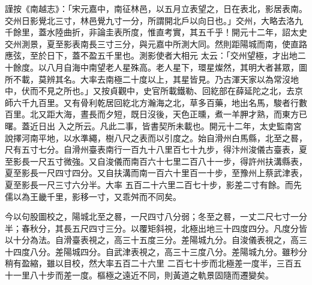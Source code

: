 \begin{pinyinscope}
 謹按《南越志》：「宋元嘉中，南征林邑，以五月立表望之，日在表北，影居表南。交州日影覺北三寸，林邑覺九寸一分，所謂開北戶以向日也。」交州，大略去洛九千餘里，蓋水陸曲折，非論圭表所度，惟直考實，其五千乎！開元十二年，詔太史交州測景，夏至影表南長三寸三分，與元嘉中所測大同。然則距陽城而南，使直路應弦，至於日下，蓋不盈五千里也。測影使者大相元
 太云：「交州望極，才出地二十餘度。以八月自海中南望老人星殊高。老人星下，環星燦然，其明大者甚眾，圖所不載，莫辨其名。大率去南極二十度以上，其星皆見。乃古渾天家以為常沒地中，伏而不見之所也。」又按貞觀中，史官所載鐵勒、回紇部在薛延陀之北，去京師六千九百里。又有骨利乾居回紇北方瀚海之北，草多百藥，地出名馬，駿者行數百里。北又距大海，晝長而夕短，既日沒後，天色正曛，煮一羊胛才熟，而東方已曙。蓋近日出
 入之所云。凡此二事，皆書契所未載也。開元十二年，太史監南宮說擇河南平地，以水準繩，樹八尺之表而以引度之。始自滑州白馬縣，北至之晷，尺有五寸七分。自滑州臺表南行一百九十八里百七十九步，得汴州浚儀古臺表，夏至影長一尺五寸微強。又自浚儀而南百六十七里二百八十一步，得許州扶溝縣表，夏至影長一尺四寸四分。又自扶溝而南一百六十里百一十步，至豫州上蔡武津表，夏至影長一尺三寸六分半。大率
 五百二十六里二百七十步，影差二寸有餘。而先儒以為王畿千里，影移一寸，又乖舛而不同矣。



 今以句股圖校之，陽城北至之晷，一尺四寸八分弱；冬至之晷，一丈二尺七寸一分半；春秋分，其長五尺四寸三分。以覆矩斜視，北極出地三十四度四分。凡度分皆以十分為法。自滑臺表視之，高三十五度三分。差陽城九分。自浚儀表視之，高三十四度八分。差陽城四分。自武津表視之，高三十三度八分。差陽城九分。雖秒分稍有盈縮，雖以目校，然大率五百二十六里
 二百七十步而北極差一度半，三百五十一里八十步而差一度。樞極之遠近不同，則黃道之軌景固隨而遷變矣。




\end{pinyinscope}
